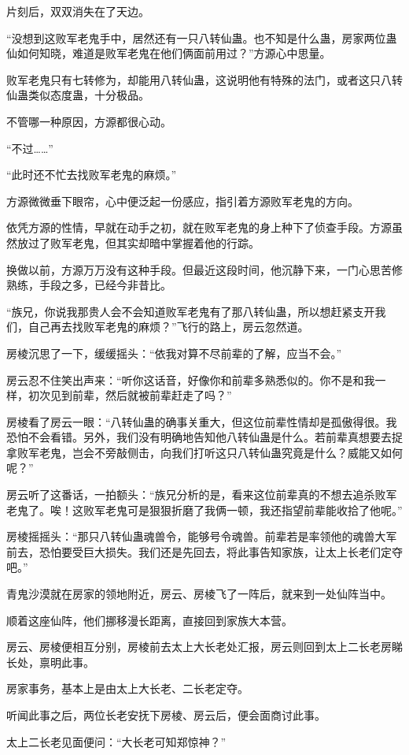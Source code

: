 \begin{this_body}
片刻后，双双消失在了天边。

“没想到这败军老鬼手中，居然还有一只八转仙蛊。也不知是什么蛊，房家两位蛊仙如何知晓，难道是败军老鬼在他们俩面前用过？”方源心中思量。

败军老鬼只有七转修为，却能用八转仙蛊，这说明他有特殊的法门，或者这只八转仙蛊类似态度蛊，十分极品。

不管哪一种原因，方源都很心动。

“不过……”

“此时还不忙去找败军老鬼的麻烦。”

方源微微垂下眼帘，心中便泛起一份感应，指引着方源败军老鬼的方向。

依凭方源的性情，早就在动手之初，就在败军老鬼的身上种下了侦查手段。方源虽然放过了败军老鬼，但其实却暗中掌握着他的行踪。

换做以前，方源万万没有这种手段。但最近这段时间，他沉静下来，一门心思苦修熟练，手段之多，已经今非昔比。

“族兄，你说我那贵人会不会知道败军老鬼有了那八转仙蛊，所以想赶紧支开我们，自己再去找败军老鬼的麻烦？”飞行的路上，房云忽然道。

房棱沉思了一下，缓缓摇头：“依我对算不尽前辈的了解，应当不会。”

房云忍不住笑出声来：“听你这话音，好像你和前辈多熟悉似的。你不是和我一样，初次见到前辈，然后就被前辈赶走了吗？”

房棱看了房云一眼：“八转仙蛊的确事关重大，但这位前辈性情却是孤傲得很。我恐怕不会看错。另外，我们没有明确地告知他八转仙蛊是什么。若前辈真想要去捉拿败军老鬼，岂会不旁敲侧击，向我们打听这只八转仙蛊究竟是什么？威能又如何呢？”

房云听了这番话，一拍额头：“族兄分析的是，看来这位前辈真的不想去追杀败军老鬼了。唉！这败军老鬼可是狠狠折磨了我俩一顿，我还指望前辈能收拾了他呢。”

房棱摇摇头：“那只八转仙蛊魂兽令，能够号令魂兽。前辈若是率领他的魂兽大军前去，恐怕要受巨大损失。我们还是先回去，将此事告知家族，让太上长老们定夺吧。”

青鬼沙漠就在房家的领地附近，房云、房棱飞了一阵后，就来到一处仙阵当中。

顺着这座仙阵，他们挪移漫长距离，直接回到家族大本营。

房云、房棱便相互分别，房棱前去太上大长老处汇报，房云则回到太上二长老房睇长处，禀明此事。

房家事务，基本上是由太上大长老、二长老定夺。

听闻此事之后，两位长老安抚下房棱、房云后，便会面商讨此事。

太上二长老见面便问：“大长老可知郑惊神？”


\end{this_body}
